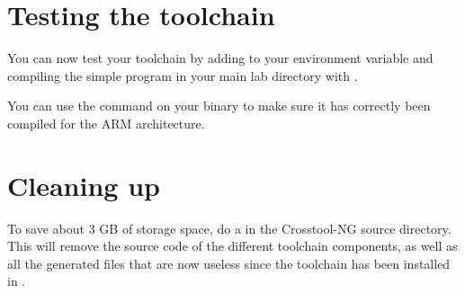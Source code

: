 \section{Testing the toolchain}

You can now test your toolchain by adding
 to your
 environment variable and compiling the simple
 program in your main lab directory with
.

You can use the  command on your binary to make sure it has
correctly been compiled for the ARM architecture.

\section{Cleaning up}

To save about 3 GB of storage space, do a  in the
Crosstool-NG source directory. This will remove the source code of the
different toolchain components, as well as all the generated files
that are now useless since the toolchain has been installed in
.
